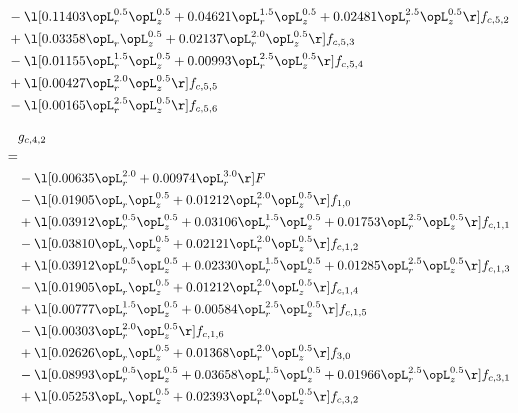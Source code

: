 \begin{alignat}{2}
& - \l[  0.11403 \opL_r^{0.5} \opL_z^{0.5} +  0.04621 \opL_r^{1.5} \opL_z^{0.5} +  0.02481 \opL_r^{2.5} \opL_z^{0.5}  \r] f_{c,5,2} \nonumber \\ 
& + \l[  0.03358 \opL_r \opL_z^{0.5} +  0.02137 \opL_r^{2.0} \opL_z^{0.5}  \r] f_{c,5,3} \nonumber \\ 
& - \l[  0.01155 \opL_r^{1.5} \opL_z^{0.5} +  0.00993 \opL_r^{2.5} \opL_z^{0.5}  \r] f_{c,5,4} \nonumber \\ 
& + \l[  0.00427 \opL_r^{2.0} \opL_z^{0.5}  \r] f_{c,5,5} \nonumber \\ 
& - \l[  0.00165 \opL_r^{2.5} \opL_z^{0.5}  \r] f_{c,5,6} \nonumber \\ 
\end{alignat} 


\begin{alignat}{2} 
\label{eq:g_42_0} 
& g_{c,4,2} \nonumber \\ 
 = \\ 
& - \l[  0.00635 \opL_r^{2.0} +  0.00974 \opL_r^{3.0}  \r] F \nonumber \\ 
& - \l[  0.01905 \opL_r \opL_z^{0.5} +  0.01212 \opL_r^{2.0} \opL_z^{0.5}  \r] f_{1,0} \nonumber \\ 
& + \l[  0.03912 \opL_r^{0.5} \opL_z^{0.5} +  0.03106 \opL_r^{1.5} \opL_z^{0.5} +  0.01753 \opL_r^{2.5} \opL_z^{0.5}  \r] f_{c,1,1} \nonumber \\ 
& - \l[  0.03810 \opL_r \opL_z^{0.5} +  0.02121 \opL_r^{2.0} \opL_z^{0.5}  \r] f_{c,1,2} \nonumber \\ 
& + \l[  0.03912 \opL_r^{0.5} \opL_z^{0.5} +  0.02330 \opL_r^{1.5} \opL_z^{0.5} +  0.01285 \opL_r^{2.5} \opL_z^{0.5}  \r] f_{c,1,3} \nonumber \\ 
& - \l[  0.01905 \opL_r \opL_z^{0.5} +  0.01212 \opL_r^{2.0} \opL_z^{0.5}  \r] f_{c,1,4} \nonumber \\ 
& + \l[  0.00777 \opL_r^{1.5} \opL_z^{0.5} +  0.00584 \opL_r^{2.5} \opL_z^{0.5}  \r] f_{c,1,5} \nonumber \\ 
& - \l[  0.00303 \opL_r^{2.0} \opL_z^{0.5}  \r] f_{c,1,6} \nonumber \\ 
& + \l[  0.02626 \opL_r \opL_z^{0.5} +  0.01368 \opL_r^{2.0} \opL_z^{0.5}  \r] f_{3,0} \nonumber \\ 
& - \l[  0.08993 \opL_r^{0.5} \opL_z^{0.5} +  0.03658 \opL_r^{1.5} \opL_z^{0.5} +  0.01966 \opL_r^{2.5} \opL_z^{0.5}  \r] f_{c,3,1} \nonumber \\ 
& + \l[  0.05253 \opL_r \opL_z^{0.5} +  0.02393 \opL_r^{2.0} \opL_z^{0.5}  \r] f_{c,3,2} \nonumber \\ 

\end{alignat}
